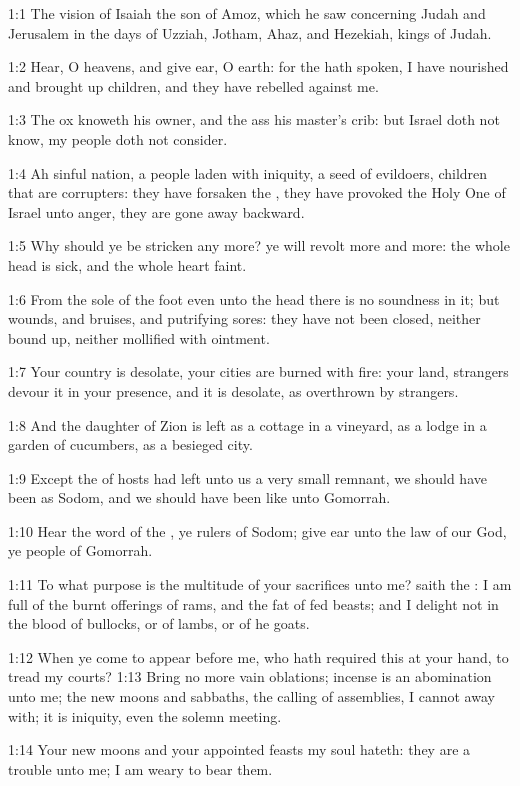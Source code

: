 

1:1 The vision of Isaiah the son of Amoz, which he saw concerning Judah and Jerusalem in the days of Uzziah, Jotham, Ahaz, and Hezekiah, kings of Judah.

1:2 Hear, O heavens, and give ear, O earth: for the \LORD hath spoken, I have nourished and brought up children, and they have rebelled against me.

1:3 The ox knoweth his owner, and the ass his master's crib: but Israel doth not know, my people doth not consider.

1:4 Ah sinful nation, a people laden with iniquity, a seed of evildoers, children that are corrupters: they have forsaken the \LORD, they have provoked the Holy One of Israel unto anger, they are gone away backward.

1:5 Why should ye be stricken any more? ye will revolt more and more: the whole head is sick, and the whole heart faint.

1:6 From the sole of the foot even unto the head there is no soundness in it; but wounds, and bruises, and putrifying sores: they have not been closed, neither bound up, neither mollified with ointment.

1:7 Your country is desolate, your cities are burned with fire: your land, strangers devour it in your presence, and it is desolate, as overthrown by strangers.

1:8 And the daughter of Zion is left as a cottage in a vineyard, as a lodge in a garden of cucumbers, as a besieged city.

1:9 Except the \LORD of hosts had left unto us a very small remnant, we should have been as Sodom, and we should have been like unto Gomorrah.

1:10 Hear the word of the \LORD, ye rulers of Sodom; give ear unto the law of our God, ye people of Gomorrah.

1:11 To what purpose is the multitude of your sacrifices unto me?  saith the \LORD: I am full of the burnt offerings of rams, and the fat of fed beasts; and I delight not in the blood of bullocks, or of lambs, or of he goats.

1:12 When ye come to appear before me, who hath required this at your hand, to tread my courts?  1:13 Bring no more vain oblations; incense is an abomination unto me; the new moons and sabbaths, the calling of assemblies, I cannot away with; it is iniquity, even the solemn meeting.

1:14 Your new moons and your appointed feasts my soul hateth: they are a trouble unto me; I am weary to bear them.

